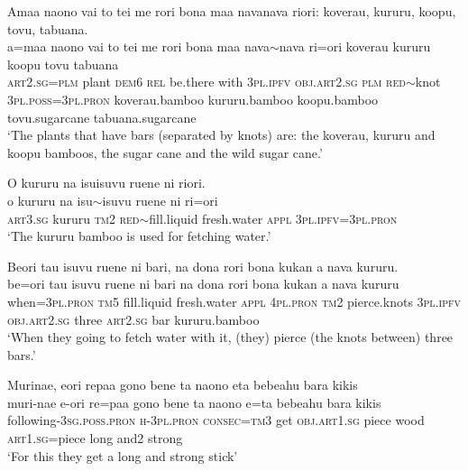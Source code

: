 \ea\label{ex:text6-23}
Amaa naono vai to tei me rori bona maa navanava riori: koverau, kururu, koopu, tovu, tabuana.\\
\gll a=maa	naono	vai	to	tei	me	rori	bona	maa	nava{$\sim$}nava	ri=ori	koverau	kururu	koopu	tovu	tabuana\\
     \textsc{art}2.\textsc{sg}=\textsc{plm}	plant	\textsc{dem}6	\textsc{rel}	be.there	with	3\textsc{pl}.\textsc{ipfv}	\textsc{obj}.\textsc{art}2.\textsc{sg}	\textsc{plm}	\textsc{red}{$\sim$}knot	3\textsc{pl}.\textsc{poss}=3\textsc{pl}.\textsc{pron}	koverau.bamboo	kururu.bamboo	koopu.bamboo	tovu.sugarcane	tabuana.sugarcane\\
\glt `The plants that have bars (separated by knots) are: the koverau, kururu and koopu bamboos, the sugar cane and the wild sugar cane.'
\z

\ea\label{ex:text6-24}
O kururu na isuisuvu ruene ni riori.\\
\gll o	kururu	na	isu{$\sim$}isuvu	ruene	ni	ri=ori\\
     \textsc{art}3.\textsc{sg}	kururu	\textsc{tm}2	\textsc{red}{$\sim$}fill.liquid	fresh.water	\textsc{appl}	3\textsc{pl}.\textsc{ipfv}=3\textsc{pl}.\textsc{pron}\\
\glt `The kururu bamboo is used for fetching water.'
\z

\ea\label{ex:text6-25}
Beori tau isuvu ruene ni bari, na dona rori bona kukan a nava kururu.\\
\gll be=ori	tau	isuvu	ruene	ni	bari	na	dona	rori	bona	kukan	a	nava	kururu\\
     when=3\textsc{pl}.\textsc{pron}	\textsc{tm}5	fill.liquid	fresh.water	\textsc{appl}	4\textsc{pl}.\textsc{pron}	\textsc{tm}2	pierce.knots	3\textsc{pl}.\textsc{ipfv}	\textsc{obj}.\textsc{art}2.\textsc{sg}	three	\textsc{art}2.\textsc{sg}	bar	kururu.bamboo\\
\glt `When they going to fetch water with it, (they) pierce (the knots between) three bars.'
\z

\ea\label{ex:text6-26}
Murinae, eori repaa gono bene ta naono eta bebeahu bara kikis\\
\gll muri-nae	e-ori	re=paa	gono	bene	ta	naono	e=ta	bebeahu	bara	kikis\\
     following-3\textsc{sg}.\textsc{poss}.\textsc{pron}	\textsc{h}-3\textsc{pl}.\textsc{pron}	\textsc{consec}=\textsc{tm}3	get	\textsc{obj}.\textsc{art}1.\textsc{sg}	piece	wood	\textsc{art}1.\textsc{sg}=piece	long	and2	strong\\
\glt `For this they get a long and strong stick'
\z

